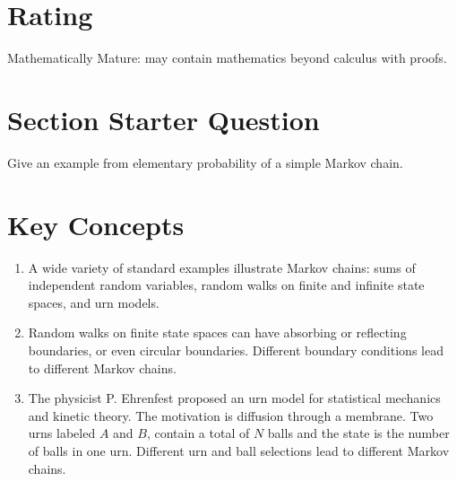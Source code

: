 \documentclass[12pt]{article}
\begin{document}
\myheader \mytitle

\hr


\hr

\usefirefox

\hr



\section*{Rating} %
Mathematically Mature:  may contain mathematics beyond calculus with
proofs.  %

\hr

\section*{Section Starter Question}

Give an example from elementary probability of a simple Markov chain.

\hr

\section*{Key Concepts}

\begin{enumerate}
    \item
        A wide variety of standard examples illustrate Markov chains:
        sums of independent random variables, random walks on finite and
        infinite state spaces, and urn models.
    \item
        Random walks on finite state spaces can have absorbing or
        reflecting boundaries, or even circular boundaries.  Different
        boundary conditions lead to different Markov chains.
    \item
        The physicist P. Ehrenfest proposed an urn model for statistical
        mechanics and kinetic theory.  The motivation is diffusion
        through a membrane.  Two urns labeled \( A \) and \( B \),
        contain a total of \( N \) balls and the state is the number of
        balls in one urn.  Different urn and ball selections lead to
        different Markov chains.
\end{enumerate}
\end{document}
